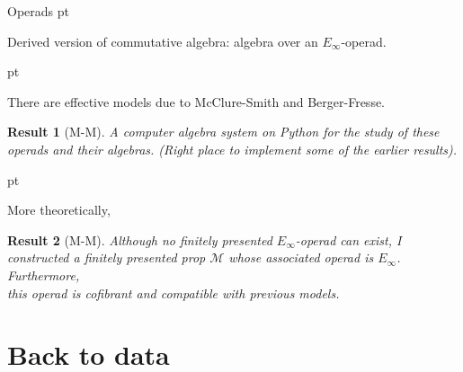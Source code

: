 \documentclass[10pt,t, handout]{beamer} %
\newtheorem{result}{Result}
\begin{document}
\begin{frame}{Operads}
	 pt
	\pause

	\textcolor{pblue}{Derived version} of commutative algebra: algebra over an $E_\infty$-operad.

	 pt
	\pause

	There are effective models due to McClure-Smith and Berger-Fresse.

	\pause

	\begin{result}[M-M]
		A computer algebra system on Python for the study of these operads and their algebras. (Right place to implement some of the earlier results).
	\end{result}

	 pt
	\pause

	More theoretically,

	\begin{result}[M-M]
		Although no finitely presented $E_\infty$-operad can exist, I constructed a finitely presented prop $\mathcal M$ whose associated operad is $E_\infty$. Furthermore, \\
		this operad is cofibrant and compatible with previous models.
	\end{result}
\end{frame}

\section{Back to data}
\end{document}
